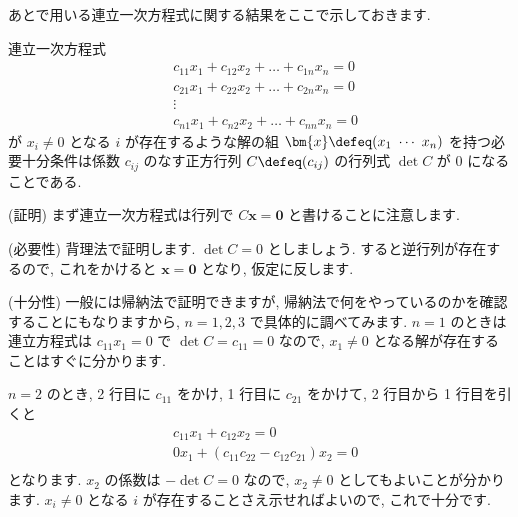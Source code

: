 \documentclass[openany, a4paper, oneside]{jsbook}
\begin{document}
あとで用いる連立一次方程式に関する結果をここで示しておきます.
\begin{thm}
連立一次方程式
    \begin{align}
        & c_{11} x_1 + c_{12} x_2 + \dots + c_{1n} x_n = 0 \\
        & c_{21} x_1 + c_{22} x_2 + \dots + c_{2n} x_n = 0 \\
        & \vdots \\
        & c_{n1} x_1 + c_{n2} x_2 + \dots + c_{n n} x_n = 0
    \end{align}
が $x_i \not= 0$ となる $i$ が存在するような解の組 $\bm{x} \defeq (x_1 \,\, \dotsb \,\, x_n)$
を持つ必要十分条件は係数 $c_{ij}$ のなす正方行列 $C \defeq (c_{ij})$ の行列式 $\det C$ が $0$ になることである.
\label{th:連立一次方程式}
\end{thm}
(証明)
まず連立一次方程式は行列で $C \bm{x} = \bm{0}$ と書けることに注意します.

(必要性)
背理法で証明します.
 $\det C =0$ としましょう.
すると逆行列が存在するので, これをかけると $\bm{x} = \bm{0}$ となり, 仮定に反します.

(十分性)
一般には帰納法で証明できますが, 帰納法で何をやっているのかを確認することにもなりますから,
 $n=1,2,3$ で具体的に調べてみます.
 $n=1$ のときは連立方程式は $c_{11}x_1=0$ で $\det C = c_{11} = 0$ なので,
 $x_1 \not=0$ となる解が存在することはすぐに分かります.

$n=2$ のとき, 2 行目に $c_{11}$ をかけ, 1 行目に $c_{21}$ をかけて, 2 行目から 1 行目を引くと
\begin{align}
        & c_{11} x_1 + c_{12} x_2 = 0 \\
        & 0 x_1 + (  c_{11}c_{22} - c_{12} c_{21} ) x_2 = 0 \\
\end{align}
となります.
 $x_2$ の係数は $- \det C = 0$ なので,  $x_2 \not= 0$ としてもよいことが分かります.
 $x_i \not = 0$ となる $i$ が存在することさえ示せればよいので, これで十分です.
\end{document}
